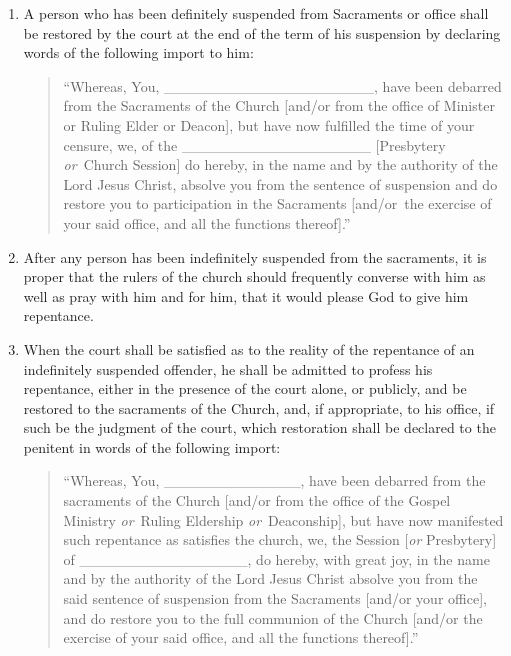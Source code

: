 \documentclass[
]{book}
\begin{document}
\begin{enumerate}
\def\labelenumi{\arabic{enumi}.}
\item
  \protect\hypertarget{41}{\href{}{}}A person who has been definitely suspended from Sacraments or office shall be restored by the court at the end of the term of his suspension by declaring words of the following import to him:

  \begin{quote}
  ``Whereas, You, \_\_\_\_\_\_\_\_\_\_\_\_\_\_\_\_\_\_\_\_, have been debarred from the Sacraments of the Church {[}and/or from the office of Minister or Ruling Elder or Deacon{]}, but have now fulfilled the time of your censure, we, of the \_\_\_\_\_\_\_\_\_\_\_\_\_\_\_\_\_\_ {[}Presbytery \emph{or}~Church Session{]} do hereby, in the name and by the authority of the Lord Jesus Christ, absolve you from the sentence of suspension and do restore you to participation in the Sacraments {[}and/or~the exercise of your said office, and all the functions thereof{]}.''
  \end{quote}
\item
  After any person has been indefinitely suspended from the sacraments, it is proper that the rulers of the church should frequently converse with him as well as pray with him and for him, that it would please God to give him repentance.
\item
  When the court shall be satisfied as to the reality of the repentance of an indefinitely suspended offender, he shall be admitted to profess his repentance, either in the presence of the court alone, or publicly, and be restored to the sacraments of the Church, and, if appropriate, to his office, if such be the judgment of the court, which restoration shall be declared to the penitent in words of the following import:

  \begin{quote}
  ``Whereas, You, \_\_\_\_\_\_\_\_\_\_\_\_\_, have been debarred from the sacraments of the Church {[}and/or from the office of the Gospel Ministry \emph{or}~Ruling Eldership \emph{or}~Deaconship{]}, but have now manifested such repentance as satisfies the church, we, the Session {[}\emph{or} Presbytery{]} of \_\_\_\_\_\_\_\_\_\_\_\_\_\_\_\_, do hereby, with great joy, in the name and by the authority of the Lord Jesus Christ absolve you from the said sentence of suspension from the Sacraments {[}and/or your office{]}, and do restore you to the full communion of the Church {[}and/or the exercise of your said office, and all the functions thereof{]}.''
  \end{quote}


\end{enumerate}
\end{document}
